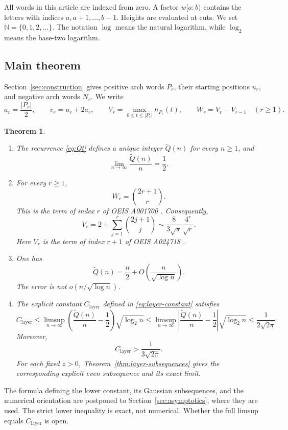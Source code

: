 \documentclass[11pt]{article}
\newtheorem{theorem}{Theorem}[section]
\theoremstyle{definition}
\theoremstyle{remark}
\newcommand{\Qt}{\widetilde Q}
\newcommand{\N}{\mathbb N}
\begin{document}
All words in this article are indexed from zero.  A factor \(w[a:b)\) contains
the letters with indices \(a,a+1,\ldots,b-1\).  Heights are evaluated at
cuts.  We set \(\N=\{0,1,2,\ldots\}\).  The notation \(\log\) means the
natural logarithm, while \(\log_2\) means the base-two logarithm.

\subsection{Main theorem}

Section~\ref{sec:construction} gives positive arch words \(P_r\), their
starting positions \(u_r\), and negative arch words \(N_r\).  We write
\[
 a_r=\frac{|P_r|}{2},
 \qquad v_r=u_r+2a_r,
 \qquad
 V_r=\max_{0\leq t\leq |P_r|}h_{P_r}(t),
 \qquad
 W_r=V_r-V_{r-1}\quad(r\geq1).
\]
\begin{theorem}
\begin{enumerate}[label=\textup{(\roman*)}]
\item The recurrence \eqref{eq:Qt} defines a unique integer \(\Qt(n)\) for
every \(n\geq1\), and
\[
 \lim_{n\to\infty}\frac{\Qt(n)}n=\frac12.
\]

\item For every \(r\geq1\),
\[
 W_r=\binom{2r+1}{r}.
\]
This is the term of index \(r\) of OEIS A001700 \cite{OEIS}.
Consequently,
\[
 V_r=2+\sum_{j=1}^r\binom{2j+1}{j}
 \sim\frac{8}{3\sqrt\pi}\frac{4^r}{\sqrt r}.
\]
Here \(V_r\) is the term of index \(r+1\) of OEIS A024718 \cite{OEIS}.

\item One has
\[
 \Qt(n)=\frac n2+O\!\left(\frac{n}{\sqrt{\log n}}\right).
\]
The error is not \(o(n/\sqrt{\log n})\).

\item The explicit constant \(C_{\mathrm{layer}}\) defined in
\eqref{eq:layer-constant} satisfies
\[
 C_{\mathrm{layer}}
 \leq\limsup_{n\to\infty}
 \left(\frac{\Qt(n)}n-\frac12\right)\sqrt{\log_2 n}
 \leq\limsup_{n\to\infty}
 \left|\frac{\Qt(n)}n-\frac12\right|\sqrt{\log_2 n}
 \leq\frac1{2\sqrt{2\pi}}.
\]
Moreover,
\[
 C_{\mathrm{layer}}>\frac1{3\sqrt{2\pi}}.
\]
For each fixed \(z>0\), Theorem~\ref{thm:layer-subsequences} gives the
corresponding explicit even subsequence and its exact limit.
\end{enumerate}
\end{theorem}

The formula defining the lower constant, its Gaussian subsequences, and the
numerical orientation are postponed to Section~\ref{sec:asymptotics}, where they are used.  The
strict lower inequality is exact, not numerical.  Whether the full limsup
equals \(C_{\mathrm{layer}}\) is open.
\end{document}
